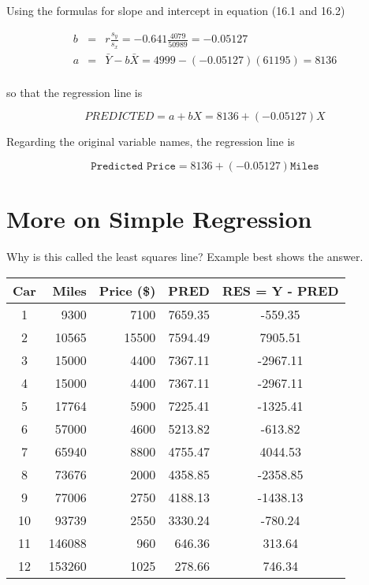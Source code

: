 \documentclass[11pt]{book}\usepackage[]{graphicx}\usepackage[]{color}
\begin{document}
Using the formulas for slope and intercept in equation (16.1 and 16.2)

\begin{eqnarray*}
b &=& r \frac{s_y}{s_x} = -0.641 \frac{4079}{50989} = -0.05127 \\
a &=& \bar{Y} - b \bar{X} = 4999 - (-0.05127)(61195) = 8136  \\
\end{eqnarray*}

so that the regression line is

\begin{equation*}
PREDICTED = a + b X = 8136 + (-0.05127) X
\end{equation*}

Regarding the original variable names, the regression line is

\begin{equation*}
  \texttt{Predicted Price} = 8136 + (-0.05127) \texttt{Miles} 
\end{equation*}

\section{More on Simple Regression}

Why is this called the least squares line?  Example best shows the answer.

\begin{table}[ht]


\centering 
\begin{tabular}{@{} c rrrc @{}} \hline 
Car & Miles & Price (\$) & PRED & RES = Y - PRED    \\ \hline
1 & 9300 & 7100 & 7659.35 & -559.35 \\
2 & 10565 & 15500 & 7594.49 & 7905.51 \\
3 & 15000 & 4400 & 7367.11 & -2967.11 \\
4 & 15000 & 4400 & 7367.11 & -2967.11 \\
5 & 17764 & 5900 & 7225.41 & -1325.41 \\
6 & 57000 & 4600 & 5213.82 & -613.82 \\
7 & 65940 & 8800 & 4755.47 & 4044.53 \\
8 & 73676 & 2000 & 4358.85 & -2358.85 \\
9 & 77006 & 2750 & 4188.13 & -1438.13 \\
10 & 93739 & 2550 & 3330.24 & -780.24 \\
11 & 146088 & 960 & 646.36 & 313.64 \\
12 & 153260 & 1025 & 278.66 & 746.34 \\ \hline
\end{tabular}
\end{table}
\end{document}
